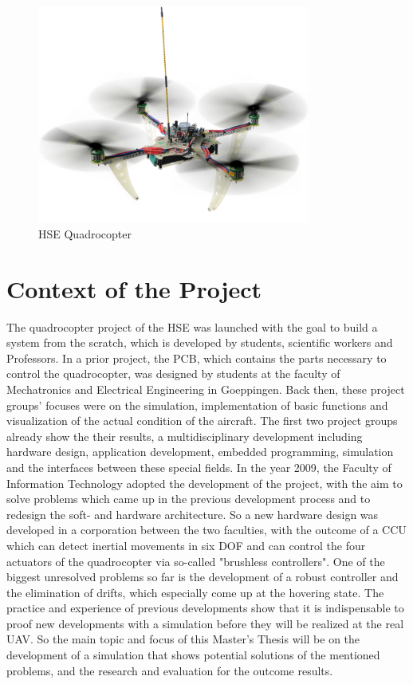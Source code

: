 \begin{figure}[!h]
	\centering
		\includegraphics[width=0.8\textwidth]{graphic/QuadrocopterV3.jpg}
	\caption{HSE Quadrocopter}
	\label{fig:QuadrocopterV3.jpg}
\end{figure}

\newpage
\section{Context of the Project}

The quadrocopter project of the \gls{HSE} was launched with the goal to build a
system from the scratch, which is developed by students, scientific workers and
Professors. In a prior project, the \gls{PCB}, which contains
the parts necessary to control the quadrocopter, was designed by students at the
faculty of Mechatronics and Electrical Engineering in Goeppingen. Back then, these project
groups' focuses were on the simulation, implementation of basic functions
and visualization of the actual condition of the aircraft. The first two project
groups already show the their results, a multidisciplinary development
including hardware design, application development, embedded programming,
simulation and the interfaces between these special fields. In the year
2009, the Faculty of Information Technology adopted the development of the
project, with the aim to solve problems which came up in the previous development process
and to redesign the soft- and hardware architecture. So a new hardware design was
developed in a corporation between the two faculties, with the outcome of a \gls{CCU}
which can detect inertial movements in six \gls{DOF} and can control the four
actuators of the quadrocopter via so-called "brushless controllers".
One of the biggest unresolved problems so far is the development of a robust
controller and the elimination of drifts, which especially come up at the hovering state.
 The practice and experience of previous developments show that it is
indispensable to proof new developments with a simulation before they will be
realized at the real \gls{UAV}. So the main topic and focus of this Master's
Thesis will be on the development of a simulation that shows potential solutions
of the mentioned problems, and the research and evaluation for the outcome results.

